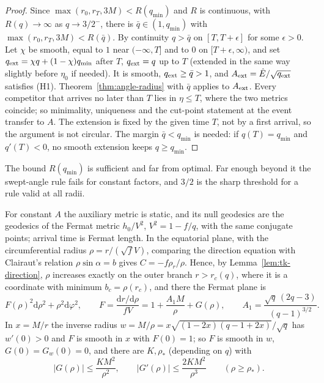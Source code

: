 \documentclass[aip,jmp,amsmath,amssymb,reprint]{revtex4-2}
\newcommand{\Ehat}{\hat E}
\newcommand{\dd}{\mathrm{d}}
\theoremstyle{plain}
\theoremstyle{definition}
\begin{document}
\begin{proof}
Since $\max(r_0,r_T,3M)<R(q_{\min})$ and $R$ is continuous, with $R(q)\to\infty$ as $q\to3/2^-$, there is
$\bar q\in(1,q_{\min})$ with $\max(r_0,r_T,3M)<R(\bar q)$. By continuity $q>\bar q$ on $[T,T+\epsilon]$ for some
$\epsilon>0$. Let $\chi$ be smooth, equal to $1$ near $(-\infty,T]$ and to $0$ on $[T+\epsilon,\infty)$, and set
$q_{\rm ext}=\chi q+(1-\chi)q_{\min}$ after $T$, $q_{\rm ext}=q$ up to $T$ (extended in the same way slightly
before $\eta_0$ if needed). It is smooth, $q_{\rm ext}\ge\bar q>1$, and $A_{\rm ext}=\Ehat/\sqrt{q_{\rm ext}}$
satisfies (H1). Theorem~\ref{thm:angle-radius} with $\bar q$ applies to $A_{\rm ext}$. Every competitor that
arrives no later than $T$ lies in $\eta\le T$, where the two metrics coincide; so minimality, uniqueness and
the cut-point statement at the event transfer to $A$. The extension is fixed by the given time $T$, not
by a first arrival, so the argument is not circular. The margin $\bar q<q_{\min}$ is needed: if $q(T)=q_{\min}$
and $q'(T)<0$, no smooth extension keeps $q\ge q_{\min}$.
\end{proof}

The bound $R(q_{\min})$ is sufficient and far from optimal. Far enough beyond it the swept-angle rule
fails for constant factors, and $3/2$ is the sharp threshold for a rule valid at all radii.

For constant $A$ the auxiliary metric is static, and its null geodesics are the geodesics of the
Fermat metric $h_0/V^2$, $V^2=1-f/q$, with the same conjugate points; arrival time is Fermat
length. In the equatorial plane, with the circumferential radius $\rho=r/(\sqrt fV)$, comparing the
direction equation with Clairaut's relation $\rho\sin\alpha=b$ gives $C=-f\rho_r/\rho$. Hence, by
Lemma~\ref{lem:tk-direction}, $\rho$ increases exactly on the outer branch $r>r_c(q)$, where it is a
coordinate with minimum $b_c=\rho(r_c)$, and there the Fermat plane is
\begin{equation}\label{eq:fermat-plane}
  F(\rho)^2\dd\rho^2+\rho^2\dd\varphi^2,\qquad
  F=\frac{\dd r/\dd\rho}{fV}=1+\frac{A_1M}{\rho}+G(\rho),\qquad
  A_1=\frac{\sqrt q\,(2q-3)}{(q-1)^{3/2}}.
\end{equation}
In $x=M/r$ the inverse radius $w=M/\rho=x\sqrt{(1-2x)(q-1+2x)}/\sqrt q$ has $w'(0)>0$ and $F$ is smooth in
$x$ with $F(0)=1$; so $F$ is smooth in $w$, $G(0)=G_w(0)=0$, and there are $K,\rho_*$ (depending on $q$) with
\begin{equation}\label{eq:G-bounds}
  |G(\rho)|\le\frac{KM^2}{\rho^2},\qquad |G'(\rho)|\le\frac{2KM^2}{\rho^3}\qquad(\rho\ge\rho_*).
\end{equation}
\end{document}

